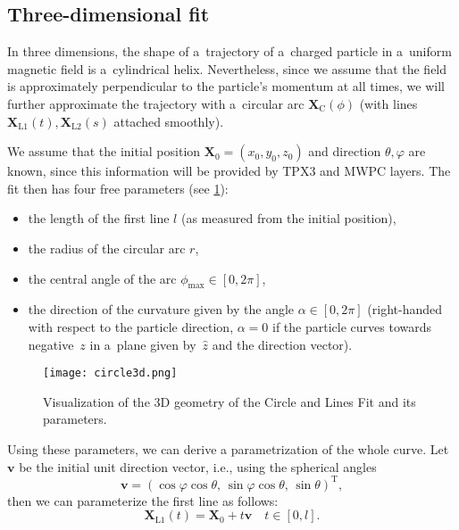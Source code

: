 		\subsection{Three-dimensional fit}
			In three dimensions, the shape of a~trajectory of a~charged particle in a~uniform magnetic field is a~cylindrical helix. Nevertheless, since we assume that the field is approximately perpendicular to the particle's momentum at all times, we will further approximate the trajectory with a~circular arc $\mathbf{X}_\text{C}(\phi)$ (with lines $\mathbf{X}_\text{L1}(t),\mathbf{X}_\text{L2}(s)$ attached smoothly).
			
			We assume that the initial position $\mathbf{X}_0 = (x_0,y_0,z_0)$ and direction $\theta,\varphi$ are known, since this information will be provided by \ac{TPX3} and \ac{MWPC} layers. The fit then has four free parameters (see \cref{fig:circle3d}):
				\begin{itemize}[nosep]
					\item the length of the first line $l$ (as measured from the initial position),
					\item the radius of the circular arc $r$,
					\item the central angle of the arc $\phi_\text{max} \in [0,2\pi]$,
					\item the direction of the curvature given by the angle $\alpha \in [0,2\pi]$ (right-handed with respect to the particle direction, $\alpha = 0$ if the particle curves towards negative~$z$ in a~plane given by~$\hat{z}$ and the direction vector).
				\end{itemize}
			\begin{figure}
				\centering
				\texttt{[image: circle3d.png]}
				\caption{Visualization of the 3D geometry of the Circle and Lines Fit and its parameters.}
				\label{fig:circle3d}
			\end{figure}
			Using these parameters, we can derive a parametrization of the whole curve. Let $\mathbf{v}$ be the initial unit direction vector, i.e., using the spherical angles
				\begin{equation}
					\mathbf{v} = (\cos\varphi\cos\theta, \,\sin\varphi\cos\theta, \,\sin\theta)^\mathrm{T},
				\end{equation}
			then we can parameterize the first line as follows:
				\begin{equation}
					\mathbf{X}_\text{L1}(t) = \mathbf{X}_0 + t\mathbf{v} \quad t\in[0,l].
				\end{equation}
